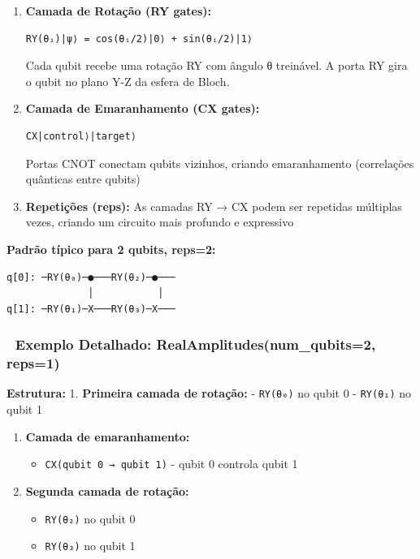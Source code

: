 \documentclass[
  brazilian,
]{report}
\providecommand{\tightlist}{%
  \setlength{\itemsep}{0pt}\setlength{\parskip}{0pt}}
\begin{document}
\begin{enumerate}
\def\labelenumi{\arabic{enumi}.}
\item
  \textbf{Camada de Rotação (RY gates):}

\begin{verbatim}
RY(θᵢ)|ψ⟩ = cos(θᵢ/2)|0⟩ + sin(θᵢ/2)|1⟩
\end{verbatim}

  Cada qubit recebe uma rotação RY com ângulo θ treinável. A porta RY
  gira o qubit no plano Y-Z da esfera de Bloch.
\item
  \textbf{Camada de Emaranhamento (CX gates):}

\begin{verbatim}
CX|control⟩|target⟩
\end{verbatim}

  Portas CNOT conectam qubits vizinhos, criando emaranhamento
  (correlações quânticas entre qubits)
\item
  \textbf{Repetições (reps):} As camadas RY → CX podem ser repetidas
  múltiplas vezes, criando um circuito mais profundo e expressivo
\end{enumerate}

\textbf{Padrão típico para 2 qubits, reps=2:}

\begin{verbatim}
q[0]: ─RY(θ₀)─●───RY(θ₂)─●───
              │           │
q[1]: ─RY(θ₁)─X───RY(θ₃)─X───
\end{verbatim}

\subsubsection{🔬 Exemplo Detalhado: RealAmplitudes(num\_qubits=2,
reps=1)}\label{exemplo-detalhado-realamplitudesnum_qubits2-reps1}

\textbf{Estrutura:} 1. \textbf{Primeira camada de rotação:} -
\texttt{RY(θ₀)} no qubit 0 - \texttt{RY(θ₁)} no qubit 1

\begin{enumerate}
\def\labelenumi{\arabic{enumi}.}
\setcounter{enumi}{1}
\tightlist
\item
  \textbf{Camada de emaranhamento:}

  \begin{itemize}
  \tightlist
  \item
    \texttt{CX(qubit\ 0\ →\ qubit\ 1)} - qubit 0 controla qubit 1
  \end{itemize}
\item
  \textbf{Segunda camada de rotação:}

  \begin{itemize}
  \tightlist
  \item
    \texttt{RY(θ₂)} no qubit 0
  \item
    \texttt{RY(θ₃)} no qubit 1
  \end{itemize}
\end{enumerate}
\end{document}
